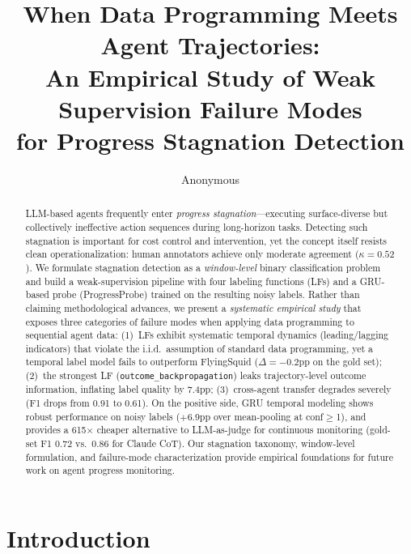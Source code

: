 \documentclass[11pt,a4paper]{article}
\title{When Data Programming Meets Agent Trajectories:\\An Empirical Study of Weak Supervision Failure Modes\\for Progress Stagnation Detection}
\author{Anonymous}
\date{}
\begin{document}
\maketitle

\begin{abstract}
LLM-based agents frequently enter \emph{progress stagnation}---executing surface-diverse but collectively ineffective action sequences during long-horizon tasks.
Detecting such stagnation is important for cost control and intervention, yet the concept itself resists clean operationalization: human annotators achieve only moderate agreement ($\kappa{=}0.52$).
We formulate stagnation detection as a \emph{window-level} binary classification problem and build a weak-supervision pipeline with four labeling functions (LFs) and a GRU-based probe (ProgressProbe) trained on the resulting noisy labels.
Rather than claiming methodological advances, we present a \emph{systematic empirical study} that exposes three categories of failure modes when applying data programming to sequential agent data:
(1)~LFs exhibit systematic temporal dynamics (leading/lagging indicators) that violate the i.i.d.\ assumption of standard data programming, yet a temporal label model fails to outperform FlyingSquid ($\Delta{=}{-}0.2$pp on the gold set);
(2)~the strongest LF (\texttt{outcome\_backpropagation}) leaks trajectory-level outcome information, inflating label quality by 7.4pp;
(3)~cross-agent transfer degrades severely (F1 drops from 0.91 to 0.61).
On the positive side, GRU temporal modeling shows robust performance on noisy labels ($+$6.9pp over mean-pooling at conf${\geq}$1), and provides a 615$\times$ cheaper alternative to LLM-as-judge for continuous monitoring (gold-set F1 0.72 vs.\ 0.86 for Claude CoT).
Our stagnation taxonomy, window-level formulation, and failure-mode characterization provide empirical foundations for future work on agent progress monitoring.
\end{abstract}

\section{Introduction}
\end{document}
